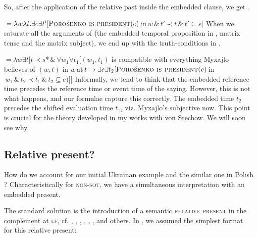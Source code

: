 \documentclass[output=paper,colorlinks,citecolor=brown]{langscibook}
\begin{document}
 
 So, after the application of the relative past inside the embedded clause, we get . 
 
 \ea\label{tp-poro}
${}=\lambda w \lambda t. 
 \exists e \exists t' [\textsc{Porošenko is president}(e)\, $in$ \, w \, \& \, t' \prec t \, \& \, t' \subseteq e]$
 \z
 When we saturate all the arguments of  (the embedded temporal proposition in , matrix tense and the matrix subject), we end up with the truth-conditions in .
 
\ea\label{lewisx}
 ${}=\lambda w   \exists t [t \prec s$*$ \, \& \,
\forall w_{1}
\forall t_{1}
[(w_{1},t_{1})$ is compatible with everything Myxajlo believes of $(w,t)$ in $w \, $at$ \,{}t \rightarrow \newline 
\exists e \exists t_{2} [\textsc{Porošenko is president}(e) \, $in$ \, w_{1} \, \& \,  t_{2} \prec t_{1} \, \& \, t_{2} \subseteq e)]
] $ 
 \z
Informally, we tend to think that the embedded reference time precedes the reference time or event time of the saying. However, this is not what happens, and our formulae capture this correctly. The embedded time $t_{2}$ precedes the shifted evaluation time $t_{1}$, viz. Myxajlo's subjective now.
This point is crucial for the theory developed in my works with von Stechow. We will soon see why.
 


\subsection{Relative present?}\label{rel-pres-sec}
How do we account for our initial Ukrainan example  and the similar one in Polish ? Characteristically for \textsc{non-sot}, we have a simultaneous interpretation with an embedded present.

The standard solution is the introduction   of a semantic \textsc{relative} \textsc{present} in the complement at \textsc{lf}, cf. \citet{ogihara96}, \citet{kusumoto99}, \citet{schlenker99},  \citet{Ogihara.Sharvit2012},  
\citet{sharvit13},  \citet{vostrikova18}, and others.
In \citet[133]{gronn_stechow2010}, we assumed the simplest format for this relative present:
\end{document}
